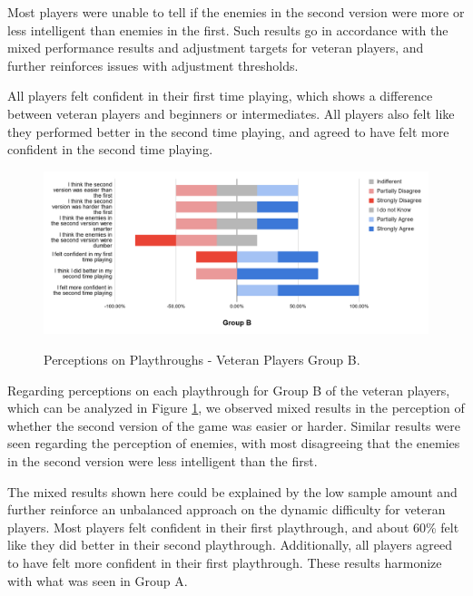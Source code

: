 Most players were unable to tell if the enemies in the second version were more or less intelligent than enemies in the first. Such results go in accordance with the mixed performance results and adjustment targets for veteran players, and further reinforces issues with adjustment thresholds.

All players felt confident in their first time playing, which shows a difference between veteran players and beginners or intermediates. All players also felt like they performed better in the second time playing, and agreed to have felt more confident in the second time playing.

\begin{figure}[!ht]
    \begin{center}
    \caption{Perceptions on Playthroughs - Veteran Players Group B.}
        \includegraphics[width=36em]{figures/fig-perception-versions-veteran-players-group-b.png}
        \label{fig:perception-playthrough-veteran-players-group-b}
    \end{center}
\end{figure}
Regarding perceptions on each playthrough for Group B of the veteran players, which can be analyzed in Figure \ref{fig:perception-playthrough-veteran-players-group-b}, we observed mixed results in the perception of whether the second version of the game was easier or harder. Similar results were seen regarding the perception of enemies, with most disagreeing that the enemies in the second version were less intelligent than the first. 

The mixed results shown here could be explained by the low sample amount and further reinforce an unbalanced approach on the dynamic difficulty for veteran players. Most players felt confident in their first playthrough, and about 60\% felt like they did better in their second playthrough. Additionally, all players agreed to have felt more confident in their first playthrough. These results harmonize with what was seen in Group A.


